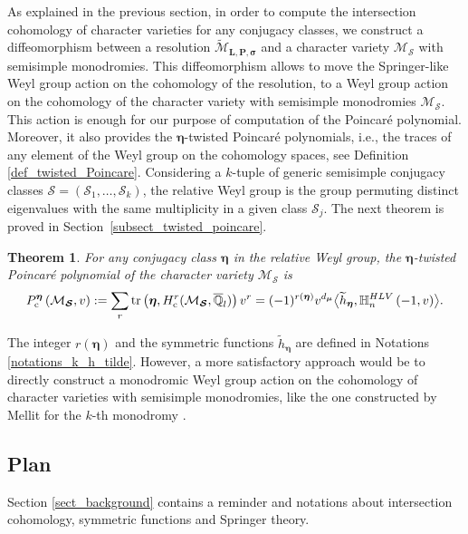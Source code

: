 \documentclass[11pt]{article}
\newcommand{\ie}{i.e.,\xspace}
\newcommand{\rc}{\mathrm{c}}
\newcommand{\HLV}{\textup{HLV}}
\newcommand{\blangle}{\bigl\langle}
\newcommand{\brangle}{\bigr\rangle}
\theoremstyle{definition}
\theoremstyle{plain}
\newtheorem{theorem}[definition]{Theorem}
\DeclareMathOperator{\tr}{tr}
\newcommand{\qlbar}{\overline{\mathbb{Q}}_l}
\newcommand{\mlps}{\widetilde{\mathcal{M}}_{\boldsymbol{L},\boldsymbol{P},\boldsymbol{\sigma}}}
\begin{document}
As explained in the previous section, in order to compute the intersection cohomology of character varieties for any conjugacy classes, we construct a diffeomorphism between a resolution $\mlps$ and a character variety $\mathcal{M}_{\boldsymbol{\mathcal{S}}}$ with semisimple monodromies. This diffeomorphism allows to move the Springer-like Weyl group action on the cohomology of the resolution, to a Weyl group action on the cohomology of the character variety with semisimple monodromies $\mathcal{M}_{\boldsymbol{\mathcal{S}}}$. This action is enough for our purpose of computation of the Poincaré polynomial. Moreover, it also provides the $\boldsymbol{\eta}$-twisted Poincaré polynomials, \ie the traces of any element of the Weyl group on the cohomology spaces, see Definition \ref{def_twisted_Poincare}. Considering a $k$-tuple of generic semisimple conjugacy classes $\boldsymbol{\mathcal{S}}=\left(\mathcal{S}_1,\dots,\mathcal{S}_k\right)$, the relative Weyl group is the group permuting distinct eigenvalues with the same multiplicity in a given class $\mathcal{S}_j$. The next theorem is proved in Section~\ref{subsect_twisted_poincare}.
\begin{theorem}\label{th_twisted_intro}
For any conjugacy class $\boldsymbol{\eta}$ in the relative Weyl group, the $\boldsymbol{\eta}$-twisted Poincaré polynomial of the character variety $\mathcal{M}_{\boldsymbol{\mathcal{S}}}$ is
\[
P_{\rc}^{\boldsymbol{\eta}}\left(\mathcal{M}_{\boldsymbol{\mathcal{S}}},v\right) :=\sum_{r} \tr\left(\boldsymbol{\eta},H_\rc^r(\mathcal{M}_{\boldsymbol{\mathcal{S}}}, \qlbar)\right)v^r = (-1)^{r(\boldsymbol{\eta})}v^{d_{\boldsymbol{\mu}}}\blangle \widetilde{h}_{\boldsymbol{\eta}},\mathbb{H}_n^{\HLV}\left(-1,v\right)\brangle.
\]
\end{theorem}

The integer $r(\boldsymbol{\eta})$ and the symmetric functions $\widetilde{h}_{\boldsymbol{\eta}}$ are defined in Notations \ref{notations_k_h_tilde}. However, a more satisfactory approach would be to directly construct a monodromic Weyl group action on the cohomology of character varieties with semisimple monodromies, like the one constructed by Mellit for the $k$-th monodromy \cite{Mellit2019}.

\subsection{Plan}
Section \ref{sect_background} contains a reminder and notations about intersection cohomology, symmetric functions and Springer theory.
\end{document}
